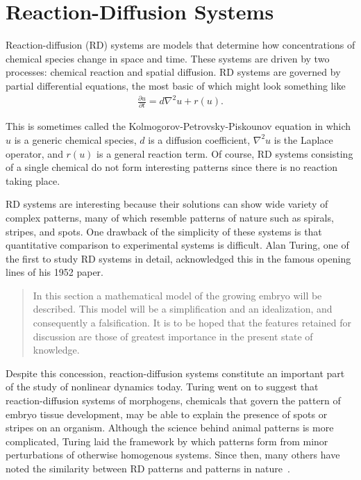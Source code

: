 \chapter{Reaction-Diffusion Systems}

	Reaction-diffusion (RD) systems are models that determine how concentrations of chemical species change in space and time. These systems are driven by two processes: chemical reaction and spatial diffusion. RD systems are governed by partial differential equations, the most basic of which might look something like
	\begin{align}
		\frac{\partial u}{\partial t} = d \nabla^2 u + r(u).
		\label{eq:KPP}
	\end{align}

This is sometimes called the Kolmogorov-Petrovsky-Piskounov equation in which $u$ is a generic chemical species, $d$ is a diffusion coefficient, $\nabla^2 u$ is the Laplace operator, and $r(u)$ is a general reaction term. Of course, RD systems consisting of a single chemical do not form interesting patterns since there is no reaction taking place.

	RD systems are interesting because their solutions can show wide variety of complex patterns, many of which resemble patterns of nature such as spirals, stripes, and spots. One drawback of the simplicity of these systems is that quantitative comparison to experimental systems is difficult. Alan Turing, one of the first to study RD systems in detail, acknowledged this in the famous opening lines of his 1952 paper.
%
\begin{quote}
In this section a mathematical model of the growing embryo will be described. This model will be a simplification and an idealization, and consequently a falsification. It is to be hoped that the features retained for discussion are those of greatest importance in the present state of knowledge.
\end{quote}
%
	Despite this concession, reaction-diffusion systems constitute an important part of the study of nonlinear dynamics today. Turing went on to suggest that reaction-diffusion systems of morphogens, chemicals that govern the pattern of embryo tissue development, may be able to explain the presence of spots or stripes on an organism. Although the science behind animal patterns is more complicated, Turing laid the framework by which patterns form from minor perturbations of otherwise homogenous systems. Since then, many others have noted the similarity between RD patterns and patterns in nature~.

